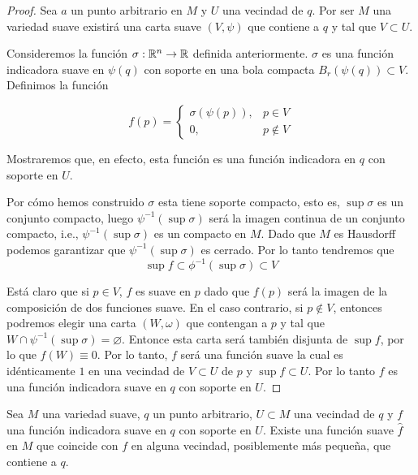 \begin{proof}
	Sea $a$ un punto arbitrario en $M$ y $U$ una vecindad de $q$. Por ser $M$ una variedad suave existirá una carta suave $(V,\psi)$ que contiene a $q$ y tal que $V \subset U$.

	Consideremos la función $\sigma: \mathbb{R}^n \to \mathbb{R}$ definida anteriormente. $\sigma$ es una función indicadora suave en $\psi(q)$ con soporte en una bola compacta $B_r(\psi(q)) \subset V$. Definimos la función

	\[
		f(p) = \begin{cases}
			\sigma(\psi(p)), & p \in V    \\
			0,               & p \notin V
		\end{cases}
	\]

	Mostraremos que, en efecto, esta función es una función indicadora en $q$ con soporte en $U$.

	Por cómo hemos construido $\sigma$ esta tiene soporte compacto, esto es, $\sup \sigma$ es un conjunto compacto, luego $\psi^{-1}(\sup \sigma)$ será la imagen continua de un conjunto compacto, i.e., $\psi^{-1}(\sup \sigma)$ es un compacto en $M$. Dado que $M$ es Hausdorff podemos garantizar que $\psi^{-1} (\sup \sigma)$ es cerrado. Por lo tanto tendremos que
	\[
		\sup f \subset \phi^{-1} (\sup \sigma) \subset V
	\]

	Está claro que si $p \in V$, $f$ es suave en $p$ dado que $f(p)$ será la imagen de la composición de dos funciones suave. En el caso contrario, si $p \notin V$, entonces podremos elegir una carta $(W,\omega)$ que contengan a $p$ y tal que $W \cap \psi^{-1}(\sup \sigma) = \varnothing$. Entonce esta carta será también disjunta de $\sup f$, por lo que $f(W) \equiv 0$. Por lo tanto, $f$ será una función suave la cual es idénticamente $1$ en una vecindad de $V \subset U$ de $p$ y $\sup f \subset U$. Por lo tanto $f$ es una función indicadora suave en $q$ con soporte en $U$.
\end{proof}

\begin{lemma}
	Sea $M$ una variedad suave, $q$ un punto arbitrario, $U \subset M$ una vecindad de $q$ y $f$ una función indicadora suave en $q$ con soporte en $U$. Existe una función suave $\hat{f}$ en $M$ que coincide con $f$ en alguna vecindad, posiblemente más pequeña, que contiene a $q$.
\end{lemma}

